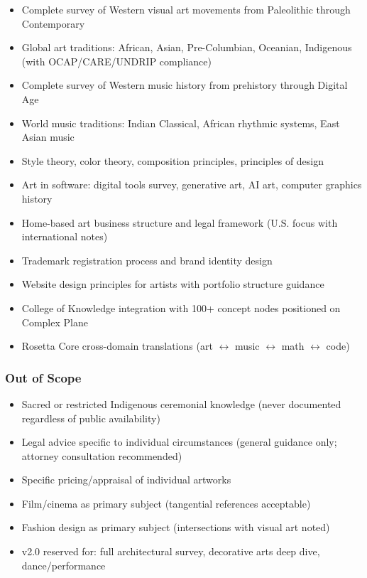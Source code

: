 \documentclass[11pt,letterpaper]{article}
\begin{document}
\begin{itemize}[noitemsep]
  \item Complete survey of Western visual art movements from Paleolithic through Contemporary
  \item Global art traditions: African, Asian, Pre-Columbian, Oceanian, Indigenous (with OCAP/CARE/UNDRIP compliance)
  \item Complete survey of Western music history from prehistory through Digital Age
  \item World music traditions: Indian Classical, African rhythmic systems, East Asian music
  \item Style theory, color theory, composition principles, principles of design
  \item Art in software: digital tools survey, generative art, AI art, computer graphics history
  \item Home-based art business structure and legal framework (U.S. focus with international notes)
  \item Trademark registration process and brand identity design
  \item Website design principles for artists with portfolio structure guidance
  \item College of Knowledge integration with 100+ concept nodes positioned on Complex Plane
  \item Rosetta Core cross-domain translations (art $\leftrightarrow$ music $\leftrightarrow$ math $\leftrightarrow$ code)
\end{itemize}

\subsubsection*{Out of Scope}

\begin{itemize}[noitemsep]
  \item Sacred or restricted Indigenous ceremonial knowledge (never documented regardless of public availability)
  \item Legal advice specific to individual circumstances (general guidance only; attorney consultation recommended)
  \item Specific pricing/appraisal of individual artworks
  \item Film/cinema as primary subject (tangential references acceptable)
  \item Fashion design as primary subject (intersections with visual art noted)
  \item v2.0 reserved for: full architectural survey, decorative arts deep dive, dance/performance
\end{itemize}
\end{document}
